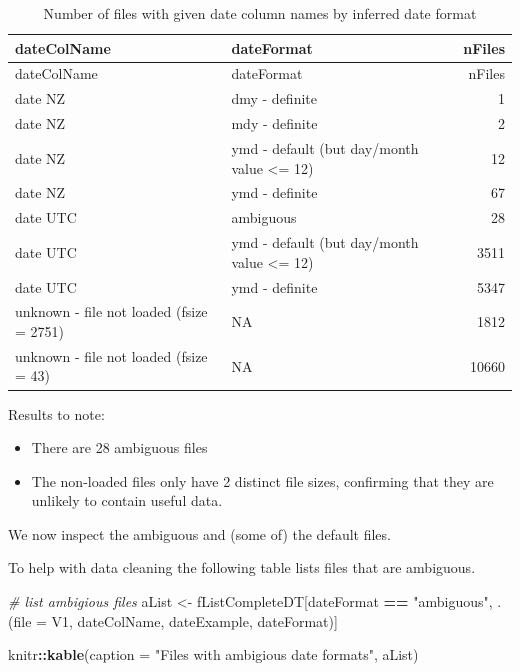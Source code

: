 \documentclass[]{article}
\newenvironment{Shaded}{\begin{snugshade}}{\end{snugshade}}
\newcommand{\KeywordTok}[1]{\textcolor[rgb]{0.13,0.29,0.53}{\textbf{#1}}}
\newcommand{\DataTypeTok}[1]{\textcolor[rgb]{0.13,0.29,0.53}{#1}}
\newcommand{\StringTok}[1]{\textcolor[rgb]{0.31,0.60,0.02}{#1}}
\newcommand{\CommentTok}[1]{\textcolor[rgb]{0.56,0.35,0.01}{\textit{#1}}}
\newcommand{\OperatorTok}[1]{\textcolor[rgb]{0.81,0.36,0.00}{\textbf{#1}}}
\newcommand{\NormalTok}[1]{#1}
\providecommand{\tightlist}{%
  \setlength{\itemsep}{0pt}\setlength{\parskip}{0pt}}
\begin{document}
\begin{longtable}[]{@{}llr@{}}
\caption{Number of files with given date column names by inferred date
format}\tabularnewline
\toprule
dateColName & dateFormat & nFiles\tabularnewline
\midrule
\endfirsthead
\toprule
dateColName & dateFormat & nFiles\tabularnewline
\midrule
\endhead
date NZ & dmy - definite & 1\tabularnewline
date NZ & mdy - definite & 2\tabularnewline
date NZ & ymd - default (but day/month value \textless{}= 12) &
12\tabularnewline
date NZ & ymd - definite & 67\tabularnewline
date UTC & ambiguous & 28\tabularnewline
date UTC & ymd - default (but day/month value \textless{}= 12) &
3511\tabularnewline
date UTC & ymd - definite & 5347\tabularnewline
unknown - file not loaded (fsize = 2751) & NA & 1812\tabularnewline
unknown - file not loaded (fsize = 43) & NA & 10660\tabularnewline
\bottomrule
\end{longtable}

Results to note:

\begin{itemize}
\tightlist
\item
  There are 28 ambiguous files
\item
  The non-loaded files only have 2 distinct file sizes, confirming that
  they are unlikely to contain useful data.
\end{itemize}

We now inspect the ambiguous and (some of) the default files.

To help with data cleaning the following table lists files that are
ambiguous.

\begin{Shaded}
\begin{Highlighting}[]
\CommentTok{# list ambigious files}
\NormalTok{aList <-}\StringTok{ }\NormalTok{fListCompleteDT[dateFormat }\OperatorTok{==}\StringTok{ "ambiguous"}\NormalTok{, .(}\DataTypeTok{file =}\NormalTok{ V1, dateColName, dateExample, dateFormat)]}

\NormalTok{knitr}\OperatorTok{::}\KeywordTok{kable}\NormalTok{(}\DataTypeTok{caption =} \StringTok{"Files with ambigious date formats"}\NormalTok{, aList)}
\end{Highlighting}
\end{Shaded}
\end{document}
